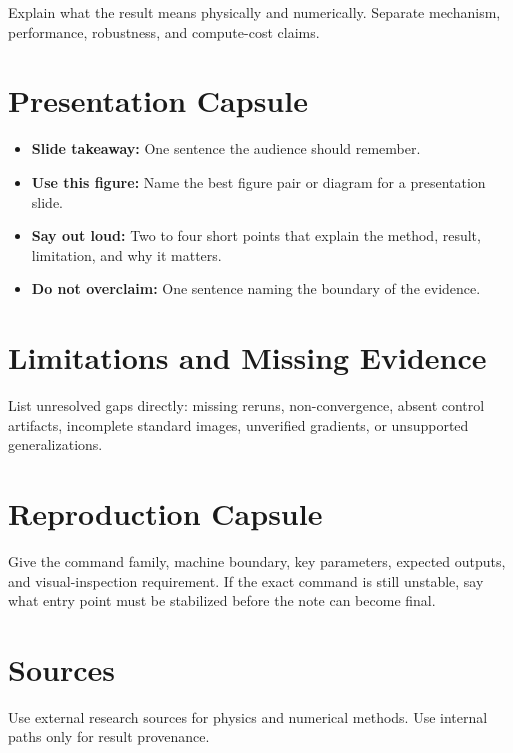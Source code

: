 \documentclass[11pt]{article}
\begin{document}
Explain what the result means physically and numerically.  Separate mechanism,
performance, robustness, and compute-cost claims.

\section{Presentation Capsule}

\begin{itemize}
\item \textbf{Slide takeaway:} One sentence the audience should remember.
\item \textbf{Use this figure:} Name the best figure pair or diagram for a
  presentation slide.
\item \textbf{Say out loud:} Two to four short points that explain the method,
  result, limitation, and why it matters.
\item \textbf{Do not overclaim:} One sentence naming the boundary of the
  evidence.
\end{itemize}

\section{Limitations and Missing Evidence}

List unresolved gaps directly: missing reruns, non-convergence, absent control
artifacts, incomplete standard images, unverified gradients, or unsupported
generalizations.

\section{Reproduction Capsule}

Give the command family, machine boundary, key parameters, expected outputs,
and visual-inspection requirement.  If the exact command is still unstable,
say what entry point must be stabilized before the note can become final.

\section{Sources}

Use external research sources for physics and numerical methods.  Use internal
paths only for result provenance.
\end{document}
